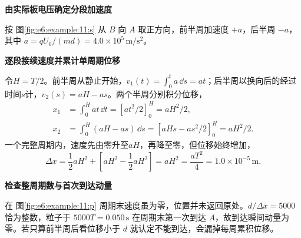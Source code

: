 \begin{solution}\textbf{由实际板电压确定分段加速度}\par\nobreak
按 图\ref{fig:e6:example:11:s} 从 $B$ 向 $A$ 取正方向，前半周加速度 $+a$，后半周 $-a$，其中 $a=qU_0/(md)=4.0\times10^5\,\mathrm{m/s^2}$。

\par\medskip{}\noindent\textbf{逐段接续速度并累计单周期位移}\par\nobreak
令$H=T/2$。前半周从静止开始，$v_1(t)=\int_0^t a\,\dd s=at$；后半周以换向后的经过时间$s$计，$v_2(s)=aH-as$。两个半周分别积分位移，
\[
\begin{aligned}
x_1&=\int_0^H at\,\dd t=[at^2/2]_0^H=aH^2/2,\\
x_2&=\int_0^H(aH-as)\,\dd s
=[aHs-as^2/2]_0^H=aH^2/2.
\end{aligned}
\]
一个完整周期内，速度先由零升至$aH$，再降至零，但位移始终增加，
\[
 \Delta x=\frac12aH^2+\left[aH^2-\frac12aH^2\right]
 =aH^2=\frac{aT^2}{4}=1.0\times10^{-5}\,\mathrm m.
\]



\par\medskip{}\noindent\textbf{检查整周期数与首次到达动量}\par\nobreak
在 图\ref{fig:e6:example:11:p} 周期末速度虽为零，位置并未返回原处。$d/\Delta x=5000$ 恰为整数，粒子于 $5000T=0.050\,\mathrm s$ 在周期末第一次到达 $A$，故到达瞬间动量为零。若只算前半周后看位移小于 $d$ 就认定不能到达，会漏掉每周累积位移。




\end{solution}
